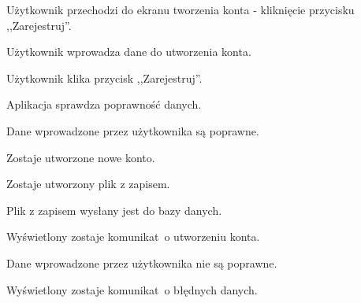 \documentclass[12pt, a4paper]{article} %
\begin{document}
\hfill \break
\begin{usecase}
	\noaka
	\addpath
	\begin{usecases}
		\item Użytkownik przechodzi do ekranu tworzenia konta - kliknięcie przycisku ,,Zarejestruj''.
		\item Użytkownik wprowadza dane do utworzenia konta.
		\item Użytkownik klika przycisk ,,Zarejestruj''.
		\item Aplikacja sprawdza poprawność danych.
		\begin{usecases}
			\item Dane wprowadzone przez użytkownika są poprawne.
			\begin{usecases}
				\item Zostaje utworzone nowe konto.
				\item Zostaje utworzony plik z zapisem.
				\item Plik z zapisem wysłany jest do bazy danych.
				\item Wyświetlony zostaje komunikat~o utworzeniu konta.
			\end{usecases}
			\item Dane wprowadzone przez użytkownika nie są poprawne.
			\begin{usecases}
				\item Wyświetlony zostaje komunikat~o błędnych danych.
			\end{usecases}
		\end{usecases}
	\end{usecases}
\end{usecase}
\end{document}
